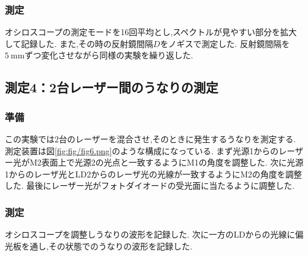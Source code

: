\subsubsection{測定}
オシロスコープの測定モードを16回平均とし,スペクトルが見やすい部分を拡大して記録した.
また,その時の反射鏡間隔$D$をノギスで測定した.
反射鏡間隔を$5\ \si{\milli\metre}$ずつ変化させながら同様の実験を繰り返した.
\subsection{測定4：2台レーザー間のうなりの測定}
\subsubsection{準備}
この実験では2台のレーザーを混合させ,そのときに発生するうなりを測定する.
測定装置は図\ref{fig:fig/fig6.png}のような構成になっている.
まず光源1からのレーザー光がM2表面上で光源2の光点と一致するようにM1の角度を調整した.
次に光源1からのレーザ光とLD2からのレーザ光の光線が一致するようにM2の角度を調整した.
最後にレーザー光がフォトダイオードの受光面に当たるように調整した.
\subsubsection{測定}
オシロスコープを調整しうなりの波形を記録した.
次に一方のLDからの光線に偏光板を通し,その状態でのうなりの波形を記録した.